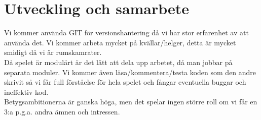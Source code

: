 \section{Utveckling och samarbete}
Vi kommer använda GIT för versionshantering då vi har stor erfarenhet av att använda det. Vi kommer arbeta mycket på kvällar/helger, detta är mycket smidigt då vi är rumskamrater.\\
\vspace{11pt}
Då spelet är modulärt är det lätt att dela upp arbetet, då man jobbar på separata moduler. Vi kommer även läsa/kommentera/testa koden som den andre skrivit så vi får full förståelse för hela spelet och fångar eventuella buggar och ineffektiv kod.\\
\vspace{11pt}
Betygsambitionerna är ganska höga, men det spelar ingen större roll om vi får en 3:a p.g.a. andra ämnen och intressen.\\
